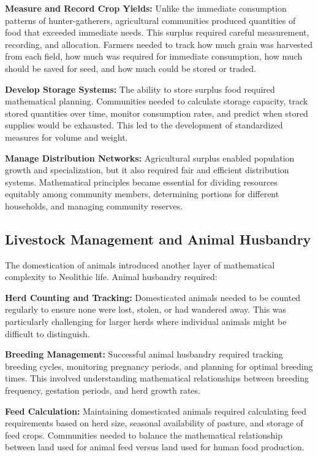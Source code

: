 \documentclass[12pt, oneside, openany]{book}
\begin{document}
\textbf{Measure and Record Crop Yields:} Unlike the immediate consumption patterns of hunter-gatherers, agricultural communities produced quantities of food that exceeded immediate needs. This surplus required careful measurement, recording, and allocation. Farmers needed to track how much grain was harvested from each field, how much was required for immediate consumption, how much should be saved for seed, and how much could be stored or traded.

\textbf{Develop Storage Systems:} The ability to store surplus food required mathematical planning. Communities needed to calculate storage capacity, track stored quantities over time, monitor consumption rates, and predict when stored supplies would be exhausted. This led to the development of standardized measures for volume and weight.

\textbf{Manage Distribution Networks:} Agricultural surplus enabled population growth and specialization, but it also required fair and efficient distribution systems. Mathematical principles became essential for dividing resources equitably among community members, determining portions for different households, and managing community reserves.

\subsection{Livestock Management and Animal Husbandry}

The domestication of animals introduced another layer of mathematical complexity to Neolithic life. Animal husbandry required:

\textbf{Herd Counting and Tracking:} Domesticated animals needed to be counted regularly to ensure none were lost, stolen, or had wandered away. This was particularly challenging for larger herds where individual animals might be difficult to distinguish.

\textbf{Breeding Management:} Successful animal husbandry required tracking breeding cycles, monitoring pregnancy periods, and planning for optimal breeding times. This involved understanding mathematical relationships between breeding frequency, gestation periods, and herd growth rates.

\textbf{Feed Calculation:} Maintaining domesticated animals required calculating feed requirements based on herd size, seasonal availability of pasture, and storage of feed crops. Communities needed to balance the mathematical relationship between land used for animal feed versus land used for human food production.
\end{document}
